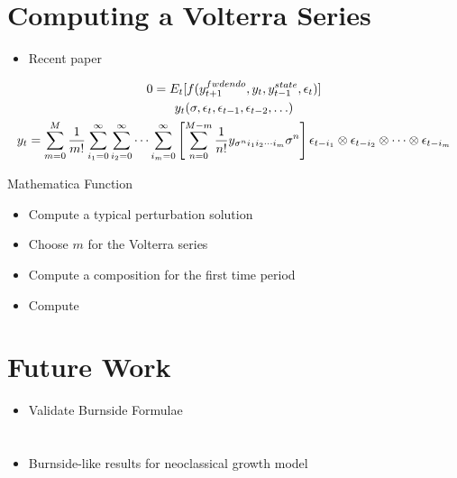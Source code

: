 \documentclass[12pt]{article}
\begin{document}
\section{Computing a Volterra Series}


{

  \begin{itemize}
  \item Recent paper\cite{meyer-gohde10,lan13} 
  \end{itemize}
    \begin{gather*}
0=E_t [ f(y_{t+1}^{fwdendo},y_t,y_{t-1}^{state},\epsilon_t)]\\
y_t(\sigma,\epsilon_{t},\epsilon_{t-1},\epsilon_{t-2},\ldots)\\
      y_t= \sum_{m=0}^M\frac{1}{m!} \sum_{i_1=0}^\infty\sum_{i_2=0}^\infty\cdots\sum_{i_m=0}^\infty\left [ \sum_{n=0}^{M-m} \frac{1}{n!} y_{\sigma^n i_1 i_2\cdots i_m}\sigma^n\right ] \epsilon_{t-i_1}\otimes \epsilon_{t-i_2} \otimes \cdots \otimes \epsilon_{t-i_m}
    \end{gather*}
}


{Mathematica Function}
   \begin{itemize}
   \item Compute a typical perturbation solution
   \item Choose $m$ for the Volterra series
   \item Compute a composition for the first time period
   \item Compute 
   \end{itemize}



\section{Future Work}
\label{sec:future-work}

\begin{itemize}
\item Validate Burnside Formulae\section{}
\item Burnside-like results for neoclassical growth model
\end{itemize}


\end{document}

